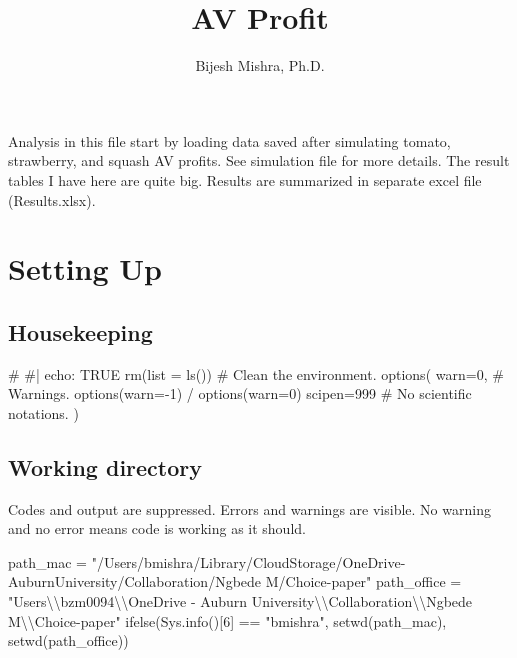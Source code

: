 \documentclass[
  letterpaper,
  DIV=11,
  numbers=noendperiod]{scrartcl}
\title{AV Profit}
\author{Bijesh Mishra, Ph.D.}
\date{}
\newenvironment{Shaded}{\begin{snugshade}}{\end{snugshade}}
\newcommand{\AttributeTok}[1]{\textcolor[rgb]{0.40,0.45,0.13}{#1}}
\newcommand{\CommentTok}[1]{\textcolor[rgb]{0.37,0.37,0.37}{#1}}
\newcommand{\DecValTok}[1]{\textcolor[rgb]{0.68,0.00,0.00}{#1}}
\newcommand{\FunctionTok}[1]{\textcolor[rgb]{0.28,0.35,0.67}{#1}}
\newcommand{\NormalTok}[1]{\textcolor[rgb]{0.00,0.23,0.31}{#1}}
\newcommand{\OtherTok}[1]{\textcolor[rgb]{0.00,0.23,0.31}{#1}}
\newcommand{\SpecialCharTok}[1]{\textcolor[rgb]{0.37,0.37,0.37}{#1}}
\newcommand{\StringTok}[1]{\textcolor[rgb]{0.13,0.47,0.30}{#1}}
\renewcommand*\contentsname{Table of contents}
\newcommand\contentsname{Table of contents}
\begin{document}
\maketitle

\renewcommand*\contentsname{Table of contents}
{
\hypersetup{linkcolor=}
\setcounter{tocdepth}{3}
\tableofcontents
}
\newpage

Analysis in this file start by loading data saved after simulating
tomato, strawberry, and squash AV profits. See simulation file for more
details. The result tables I have here are quite big. Results are
summarized in separate excel file (Results.xlsx).

\section{Setting Up}\label{setting-up}

\subsection{Housekeeping}\label{housekeeping}

\begin{Shaded}
\begin{Highlighting}[]
\CommentTok{\# \#| echo: TRUE}
\FunctionTok{rm}\NormalTok{(}\AttributeTok{list =} \FunctionTok{ls}\NormalTok{()) }\CommentTok{\# Clean the environment.}
\FunctionTok{options}\NormalTok{(}
  \AttributeTok{warn=}\DecValTok{0}\NormalTok{, }\CommentTok{\# Warnings. options(warn={-}1) / options(warn=0)}
  \AttributeTok{scipen=}\DecValTok{999} \CommentTok{\# No scientific notations.}
\NormalTok{  )}
\end{Highlighting}
\end{Shaded}

\subsection{Working directory}\label{working-directory}

Codes and output are suppressed. Errors and warnings are visible. No
warning and no error means code is working as it should.

\begin{Shaded}
\begin{Highlighting}[]
\NormalTok{path\_mac }\OtherTok{=} \StringTok{"/Users/bmishra/Library/CloudStorage/OneDrive{-}AuburnUniversity/Collaboration/Ngbede M/Choice{-}paper"}
\NormalTok{path\_office }\OtherTok{=} \StringTok{"Users}\SpecialCharTok{\textbackslash{}\textbackslash{}}\StringTok{bzm0094}\SpecialCharTok{\textbackslash{}\textbackslash{}}\StringTok{OneDrive {-} Auburn University}\SpecialCharTok{\textbackslash{}\textbackslash{}}\StringTok{Collaboration}\SpecialCharTok{\textbackslash{}\textbackslash{}}\StringTok{Ngbede M}\SpecialCharTok{\textbackslash{}\textbackslash{}}\StringTok{Choice{-}paper"}
\FunctionTok{ifelse}\NormalTok{(}\FunctionTok{Sys.info}\NormalTok{()[}\DecValTok{6}\NormalTok{] }\SpecialCharTok{==} \StringTok{"bmishra"}\NormalTok{,}
       \FunctionTok{setwd}\NormalTok{(path\_mac),}
       \FunctionTok{setwd}\NormalTok{(path\_office))}
\end{Highlighting}
\end{Shaded}
\end{document}
